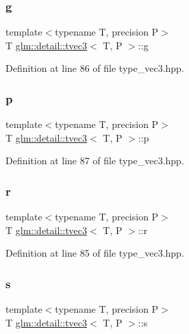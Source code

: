\subsubsection{\texorpdfstring{g}{g}}
{\footnotesize\ttfamily template$<$typename T, precision P$>$ \\
T \hyperlink{structglm_1_1detail_1_1tvec3}{glm\+::detail\+::tvec3}$<$ T, P $>$\+::g}



Definition at line 86 of file type\+\_\+vec3.\+hpp.

\mbox{\label{structglm_1_1detail_1_1tvec3_a9497f386cf253b5e7fef650b8348fc2f}} 
\subsubsection{\texorpdfstring{p}{p}}
{\footnotesize\ttfamily template$<$typename T, precision P$>$ \\
T \hyperlink{structglm_1_1detail_1_1tvec3}{glm\+::detail\+::tvec3}$<$ T, P $>$\+::p}



Definition at line 87 of file type\+\_\+vec3.\+hpp.

\mbox{\label{structglm_1_1detail_1_1tvec3_ac31894f162d510226b171f84693ac6f6}} 
\subsubsection{\texorpdfstring{r}{r}}
{\footnotesize\ttfamily template$<$typename T, precision P$>$ \\
T \hyperlink{structglm_1_1detail_1_1tvec3}{glm\+::detail\+::tvec3}$<$ T, P $>$\+::r}



Definition at line 85 of file type\+\_\+vec3.\+hpp.

\mbox{\label{structglm_1_1detail_1_1tvec3_aa7906d8cd1a54c96ba22c1f97ebaf7cc}} 
\subsubsection{\texorpdfstring{s}{s}}
{\footnotesize\ttfamily template$<$typename T, precision P$>$ \\
T \hyperlink{structglm_1_1detail_1_1tvec3}{glm\+::detail\+::tvec3}$<$ T, P $>$\+::s}



